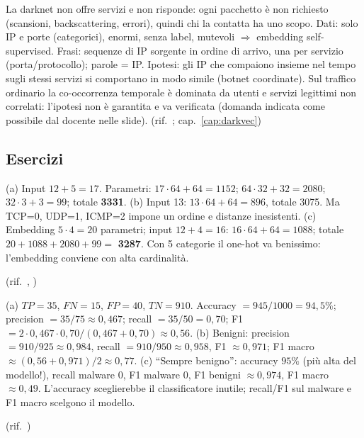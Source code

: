 \begin{soluzione}[A19 -- DarkVec]
La darknet non offre servizi e non risponde: ogni pacchetto è non richiesto (scansioni, backscattering, errori), quindi chi la contatta ha
uno scopo. Dati: solo IP e porte (categorici), enormi, senza label, mutevoli $\Rightarrow$ embedding self-supervised. Frasi: sequenze di
IP sorgente in ordine di arrivo, una per servizio (porta/protocollo); parole = IP. Ipotesi: gli IP che compaiono insieme nel tempo sugli
stessi servizi si comportano in modo simile (botnet coordinate). Sul traffico ordinario la co-occorrenza temporale è dominata da utenti e
servizi legittimi non correlati: l'ipotesi non è garantita e va verificata (domanda indicata come possibile dal docente nelle slide).
(rif.\ ; cap.~\ref{cap:darkvec})
\end{soluzione}

\subsection*{Esercizi}

\begin{soluzione}
(a) Input $12 + 5 = 17$. Parametri: $17\cdot64+64 = 1152$; $64\cdot32+32 = 2080$; $32\cdot3+3 = 99$; totale \textbf{3331}.
(b) Input 13: $13\cdot64+64 = 896$, totale 3075. Ma TCP=0, UDP=1, ICMP=2 impone un ordine e distanze inesistenti.
(c) Embedding $5\cdot4 = 20$ parametri; input $12+4 = 16$: $16\cdot64+64 = 1088$; totale $20+1088+2080+99 = $ \textbf{3287}.
Con 5 categorie il one-hot va benissimo: l'embedding conviene con alta cardinalità.

(rif.\ , )
\end{soluzione}

\begin{soluzione}
(a) $TP=35$, $FN=15$, $FP=40$, $TN=910$. Accuracy $= 945/1000 = 94{,}5\%$; precision $= 35/75 \approx 0{,}467$; recall $= 35/50 = 0{,}70$;
F1 $= 2\cdot0{,}467\cdot0{,}70/(0{,}467+0{,}70) \approx 0{,}56$.
(b) Benigni: precision $= 910/925 \approx 0{,}984$, recall $= 910/950 \approx 0{,}958$, F1 $\approx 0{,}971$; F1 macro $\approx (0{,}56+0{,}971)/2 \approx 0{,}77$.
(c) ``Sempre benigno'': accuracy $95\%$ (più alta del modello!), recall malware 0, F1 malware 0, F1 benigni $\approx 0{,}974$,
F1 macro $\approx 0{,}49$. L'accuracy sceglierebbe il classificatore inutile; recall/F1 sul malware e F1 macro scelgono il modello.

(rif.\ )
\end{soluzione}

